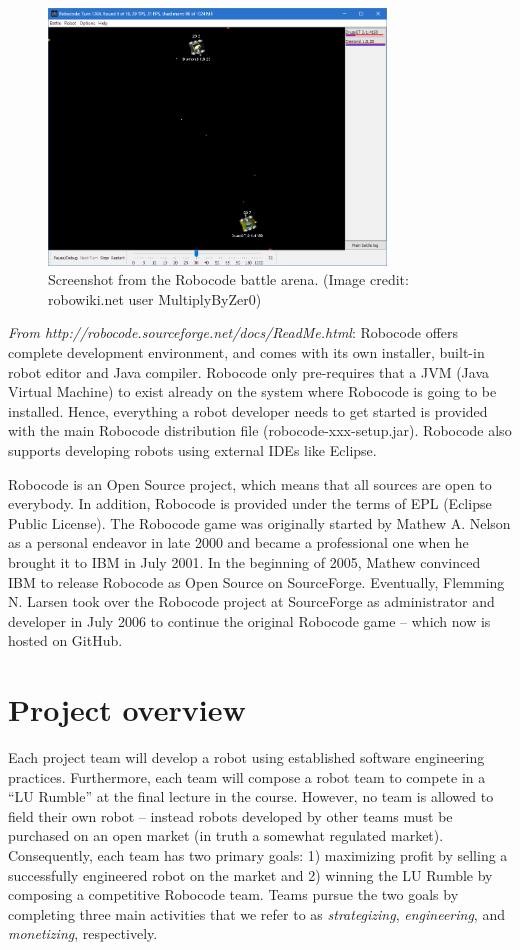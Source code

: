 \documentclass{scrreprt}
\begin{document}
\begin{figure}
\centering
\includegraphics[width=0.80\textwidth]{figures/screenshot.png}
\caption{Screenshot from the Robocode battle arena. (Image credit: robowiki.net user MultiplyByZer0)}
\label{fig:screenshot}
\end{figure}

\textit{From http://robocode.sourceforge.net/docs/ReadMe.html}:
Robocode offers complete development environment, and comes with its own installer, built-in robot editor and Java compiler. Robocode only pre-requires that a JVM (Java Virtual Machine) to exist already on the system where Robocode is going to be installed. Hence, everything a robot developer needs to get started is provided with the main Robocode distribution file (robocode-xxx-setup.jar). Robocode also supports developing robots using external IDEs like Eclipse.

Robocode is an Open Source project, which means that all sources are open to everybody. In addition, Robocode is provided under the terms of EPL (Eclipse Public License). The Robocode game was originally started by Mathew A. Nelson as a personal endeavor in late 2000 and became a professional one when he brought it to IBM in July 2001. In the beginning of 2005, Mathew convinced IBM to release Robocode as Open Source on SourceForge. Eventually, Flemming N. Larsen took over the Robocode project at SourceForge as administrator and developer in July 2006 to continue the original Robocode game -- which now is hosted on GitHub.

\section{Project overview}
Each project team will develop a robot using established software engineering practices. Furthermore, each team will compose a robot team to compete in a ``LU Rumble'' at the final lecture in the course. However, no team is allowed to field their own robot -- instead robots developed by other teams must be purchased on an open market (in truth a somewhat regulated market). Consequently, each team has two primary goals: 1) maximizing profit by selling a successfully engineered robot on the market and 2) winning the LU Rumble by composing a competitive Robocode team. Teams pursue the two goals by completing three main activities that we refer to as \textit{strategizing}, \textit{engineering}, and \textit{monetizing}, respectively.
\end{document}
